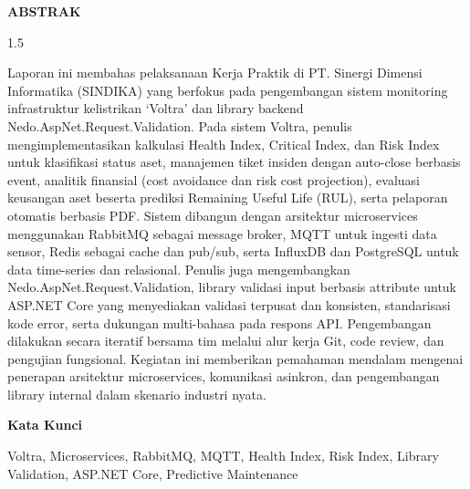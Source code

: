 \cleardoublepage
{}
{}
\begin{center}
  {\FontJudulHalaman\bfseries ABSTRAK\par}
\end{center}
\vspace{12pt}
\begin{spacing}{1.5}

Laporan ini membahas pelaksanaan Kerja Praktik di PT. Sinergi Dimensi Informatika
(SINDIKA) yang berfokus pada pengembangan sistem monitoring infrastruktur kelistrikan
`Voltra' dan library backend Nedo.AspNet.Request.Validation. Pada sistem Voltra, penulis
mengimplementasikan kalkulasi Health Index, Critical Index, dan Risk Index untuk
klasifikasi status aset, manajemen tiket insiden dengan auto-close berbasis event, analitik
finansial (cost avoidance dan risk cost projection), evaluasi keusangan aset beserta
prediksi Remaining Useful Life (RUL), serta pelaporan otomatis berbasis PDF. Sistem
dibangun dengan arsitektur microservices menggunakan RabbitMQ sebagai message broker, MQTT
untuk ingesti data sensor, Redis sebagai cache dan pub/sub, serta InfluxDB dan PostgreSQL
untuk data time-series dan relasional. Penulis juga mengembangkan
Nedo.AspNet.Request.Validation, library validasi input berbasis attribute untuk ASP.NET
Core yang menyediakan validasi terpusat dan konsisten, standarisasi kode error, serta
dukungan multi-bahasa pada respons API. Pengembangan dilakukan secara iteratif bersama tim
melalui alur kerja Git, code review, dan pengujian fungsional. Kegiatan ini memberikan pemahaman mendalam mengenai
penerapan arsitektur microservices, komunikasi asinkron, dan pengembangan library internal
dalam skenario industri nyata.

\end{spacing}

\vspace{0.5cm}
\noindent\textbf{Kata Kunci}

\noindent Voltra, Microservices, RabbitMQ, MQTT, Health Index, Risk Index, Library Validation, ASP.NET Core, Predictive Maintenance

